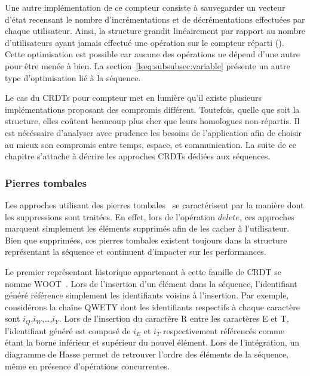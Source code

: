 Une autre implémentation de ce compteur consiste à sauvegarder un vecteur d'état
recensant le nombre d'incrémentations et de décrémentations effectuées par
chaque utilisateur. Ainsi, la structure grandit linéairement par rapport au
nombre d'utilisateurs ayant jamais effectué une opération sur le compteur
réparti (). Cette optimisation est possible car aucune
des opérations ne dépend d'une autre pour être menée à bien. La
section~\ref{lseq:subsubsec:variable} présente un autre type d'optimisation lié
à la séquence.

Le cas du CRDTs pour compteur met en lumière qu'il existe plusieurs
implémentations proposant des compromis différent.  Toutefois, quelle que soit
la structure, elles coûtent beaucoup plus cher que leurs homologues
non-répartis. Il est nécéssaire d'analyser avec prudence les besoins de
l'application afin de choisir au mieux son compromis entre temps, espace, et
communication. La suite de ce chapitre s'attache à décrire les approches CRDTs
dédiées aux séquences.

\subsubsection{Pierres tombales}
\label{lseq:subsubsec:tombstones}

Les approches utilisant des pierres tombales~\cite{ahmed2011evaluating,
  conway2014language, grishchenko2010deep, oster2006data,
  preguica2009commutative, roh2011replicated, weiss2007wooki, wu2010partial,
  yu2012stringwise} se caractérisent par la manière dont les suppressions sont
traitées. En effet, lors de l'opération $delete$, ces approches marquent
simplement les éléments supprimés afin de les cacher à l'utilisateur. Bien que
supprimées, ces pierres tombales existent toujours dans la structure
représentant la séquence et continuent d'impacter sur les performances.

Le premier représentant historique appartenant à cette famille de CRDT se nomme
WOOT~\cite{oster2006data}. Lors de l'insertion d'un élément dans la séquence,
l'identifiant généré référence simplement les identifiants voisins à
l'insertion. Par exemple, considérons la chaîne QWETY dont les identifiants
respectifs à chaque caractère sont $i_Q$,$i_W$,\ldots,$i_Y$. Lors de l'insertion
du caractère R entre les caractères E et T, l'identifiant généré est composé de
$i_E$ et $i_T$ respectivement référencés comme étant la borne inférieur et
supérieur du nouvel élément. Lors de l'intégration, un diagramme de Hasse permet
de retrouver l'ordre des éléments de la séquence, même en présence d'opérations
concurrentes. 

